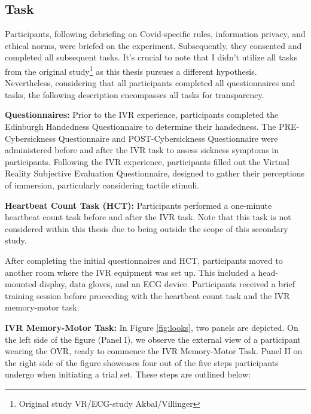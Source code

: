\documentclass[12pt,oneside,openright]{report}
\begin{document}
\subsection*{Task}

Participants, following debriefing on Covid-specific rules, information privacy, and ethical norms, were briefed on the experiment. Subsequently, they consented and completed all subsequent tasks. It's crucial to note that I didn't utilize all tasks from the original study\footnote{Original study VR/ECG-study Akbal/Villinger} as this thesis pursues a different hypothesis. Nevertheless, considering that all participants completed all questionnaires and tasks, the following description encompasses all tasks for transparency.

\textbf{Questionnaires:} Prior to the IVR experience, participants completed the Edinburgh Handedness Questionnaire to determine their handedness. The PRE-Cybersickness Questionnaire and POST-Cybersickness Questionnaire were administered before and after the IVR task to assess sickness symptoms in participants. Following the IVR experience, participants filled out the Virtual Reality Subjective Evaluation Questionnaire, designed to gather their perceptions of immersion, particularly considering tactile stimuli. 

\textbf{Heartbeat Count Task (HCT):} Participants performed a one-minute heartbeat count task before and after the IVR task. Note that this task is not considered within this thesis due to being outside the scope of this secondary study.

After completing the initial questionnaires and HCT, participants moved to another room where the IVR equipment was set up. This included a head-mounted display, data gloves, and an ECG device. Participants received a brief training session before proceeding with the heartbeat count task and the IVR memory-motor task.

\textbf{IVR Memory-Motor Task:} In Figure \ref{fig:looks}, two panels are depicted. On the left side of the figure (Panel I), we observe the external view of a participant wearing the OVR, ready to commence the IVR Memory-Motor Task. Panel II on the right side of the figure showcases four out of the five steps participants undergo when initiating a trial set. These steps are outlined below:
\end{document}
